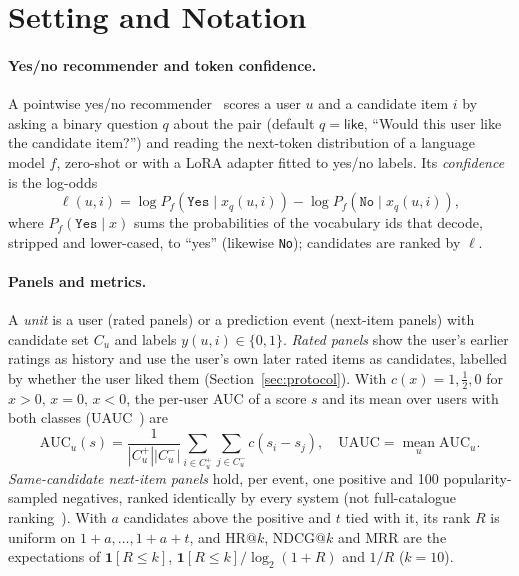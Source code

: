 \section{Setting and Notation}
\label{sec:prelim}

\paragraph{Yes/no recommender and token confidence.}
A pointwise yes/no recommender~\citep{bao2023tallrec,zhang2025collm} scores a user $u$ and a candidate item $i$ by asking a
binary question $q$ about the pair (default $q=\textsf{like}$, ``Would this user like the candidate item?'') and reading the
next-token distribution of a language model $f$, zero-shot or with a LoRA adapter fitted to yes/no labels. Its
\emph{confidence} is the log-odds
\begin{equation}\label{eq:logit}
  \ell(u,i)=\log P_f(\texttt{Yes}\mid x_q(u,i))-\log P_f(\texttt{No}\mid x_q(u,i)),
\end{equation}
where $P_f(\texttt{Yes}\mid x)$ sums the probabilities of the vocabulary ids that decode, stripped and lower-cased, to ``yes''
(likewise \texttt{No}); candidates are ranked by $\ell$.

\paragraph{Panels and metrics.}
A \emph{unit} is a user (rated panels) or a prediction event (next-item panels) with candidate set $C_u$ and labels
$y(u,i)\in\{0,1\}$. \emph{Rated panels} show the user's earlier ratings as history and use the user's own later rated items as
candidates, labelled by whether the user liked them (Section~\ref{sec:protocol}). With $c(x)=1,\tfrac12,0$ for $x>0,\,x=0,\,x<0$,
the per-user AUC of a score $s$ and its mean over users with both classes (UAUC~\citep{zhang2025collm,zhang2024binllm}) are
\[
  \mathrm{AUC}_u(s)=\frac{1}{|C_u^+||C_u^-|}\sum_{i\in C_u^+}\sum_{j\in C_u^-}c(s_i-s_j),\quad
  \mathrm{UAUC}=\operatorname*{mean}_{u}\mathrm{AUC}_u .
\]
\emph{Same-candidate next-item panels} hold, per event, one positive and 100 popularity-sampled negatives, ranked identically by
every system (not full-catalogue ranking~\citep{krichene2020sampled}). With $a$ candidates above the positive and $t$ tied with it,
its rank $R$ is uniform on $1{+}a,\dots,1{+}a{+}t$, and HR@$k$, NDCG@$k$ and MRR are the expectations of $\mathbf 1[R{\le}k]$,
$\mathbf 1[R{\le}k]/\log_2(1{+}R)$ and $1/R$ ($k{=}10$).

